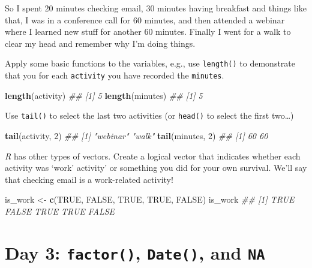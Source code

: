 \documentclass[]{book}
\newenvironment{Shaded}{\begin{snugshade}}{\end{snugshade}}
\newcommand{\CommentTok}[1]{\textcolor[rgb]{0.56,0.35,0.01}{\textit{#1}}}
\newcommand{\DecValTok}[1]{\textcolor[rgb]{0.00,0.00,0.81}{#1}}
\newcommand{\KeywordTok}[1]{\textcolor[rgb]{0.13,0.29,0.53}{\textbf{#1}}}
\newcommand{\NormalTok}[1]{#1}
\newcommand{\OtherTok}[1]{\textcolor[rgb]{0.56,0.35,0.01}{#1}}
\newcommand{\StringTok}[1]{\textcolor[rgb]{0.31,0.60,0.02}{#1}}
\begin{document}
So I spent 20 minutes checking email, 30 minutes having breakfast and things like that, I was in a conference call for 60 minutes, and then attended a webinar where I learned new stuff for another 60 minutes. Finally I went for a walk to clear my head and remember why I'm doing things.

Apply some basic functions to the variables, e.g., use \texttt{length()} to demonstrate that you for each \texttt{activity} you have recorded the \texttt{minutes}.

\begin{Shaded}
\begin{Highlighting}[]
\KeywordTok{length}\NormalTok{(activity)}
\CommentTok{## [1] 5}
\KeywordTok{length}\NormalTok{(minutes)}
\CommentTok{## [1] 5}
\end{Highlighting}
\end{Shaded}

Use \texttt{tail()} to select the last two activities (or \texttt{head()} to select the first two\ldots{})

\begin{Shaded}
\begin{Highlighting}[]
\KeywordTok{tail}\NormalTok{(activity, }\DecValTok{2}\NormalTok{)}
\CommentTok{## [1] "webinar" "walk"}
\KeywordTok{tail}\NormalTok{(minutes, }\DecValTok{2}\NormalTok{)}
\CommentTok{## [1] 60 60}
\end{Highlighting}
\end{Shaded}

\emph{R} has other types of vectors. Create a logical vector that indicates whether each activity was `work' activity' or something you did for your own survival. We'll say that checking email is a work-related activity!

\begin{Shaded}
\begin{Highlighting}[]
\NormalTok{is_work <-}\StringTok{ }\KeywordTok{c}\NormalTok{(}\OtherTok{TRUE}\NormalTok{, }\OtherTok{FALSE}\NormalTok{, }\OtherTok{TRUE}\NormalTok{, }\OtherTok{TRUE}\NormalTok{, }\OtherTok{FALSE}\NormalTok{)}
\NormalTok{is_work}
\CommentTok{## [1]  TRUE FALSE  TRUE  TRUE FALSE}
\end{Highlighting}
\end{Shaded}

\hypertarget{day-3-factor-date-and-na}{%
\section{\texorpdfstring{Day 3: \texttt{factor()}, \texttt{Date()}, and \texttt{NA}}{Day 3: factor(), Date(), and NA}}\label{day-3-factor-date-and-na}}
\end{document}
